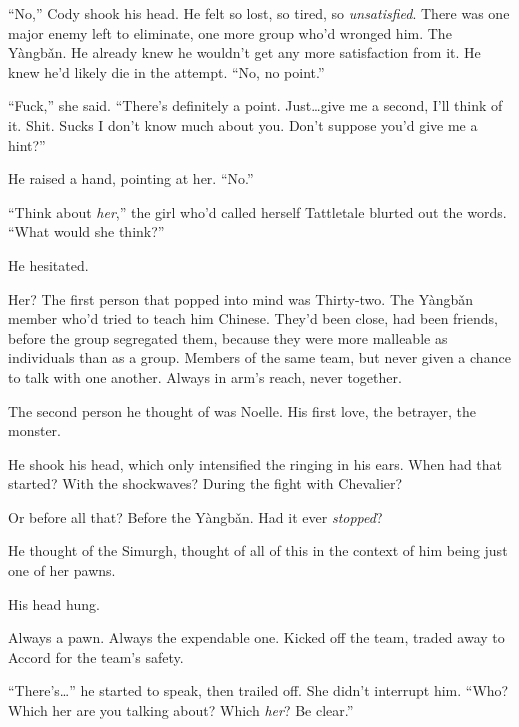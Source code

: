 ``No,'' Cody shook his head.  He felt so lost, so tired, so \emph{unsatisfied}.  There was one major enemy left to eliminate, one more group who'd wronged him.  The Y\`{a}ngb\v{a}n.  He already knew he wouldn't get any more satisfaction from it.  He knew he'd likely die in the attempt.  ``No, no point.''



``Fuck,'' she said.  ``There's definitely a point.  Just\ldots give me a second, I'll think of it.  Shit.  Sucks I don't know much about you.  Don't suppose you'd give me a hint?''



He raised a hand, pointing at her.  ``No.''



``Think about \emph{her},'' the girl who'd called herself Tattletale blurted out the words.  ``What would she think?''



He hesitated.



Her?  The first person that popped into mind was Thirty-two.  The Y\`{a}ngb\v{a}n member who'd tried to teach him Chinese.  They'd been close, had been friends, before the group segregated them, because they were more malleable as individuals than as a group.  Members of the same team, but never given a chance to talk with one another.  Always in arm's reach, never together.



The second person he thought of was Noelle.  His first love, the betrayer, the monster.



He shook his head, which only intensified the ringing in his ears.  When had that started?  With the shockwaves?  During the fight with Chevalier?



Or before all that?  Before the Y\`{a}ngb\v{a}n.  Had it ever \emph{stopped}?



He thought of the Simurgh, thought of all of this in the context of him being just one of her pawns.



His head hung.



Always a pawn.  Always the expendable one.  Kicked off the team, traded away to Accord for the team's safety.



``There's\ldots'' he started to speak, then trailed off.  She didn't interrupt him.  ``Who?  Which her are you talking about?  Which \emph{her}?  Be clear.''



